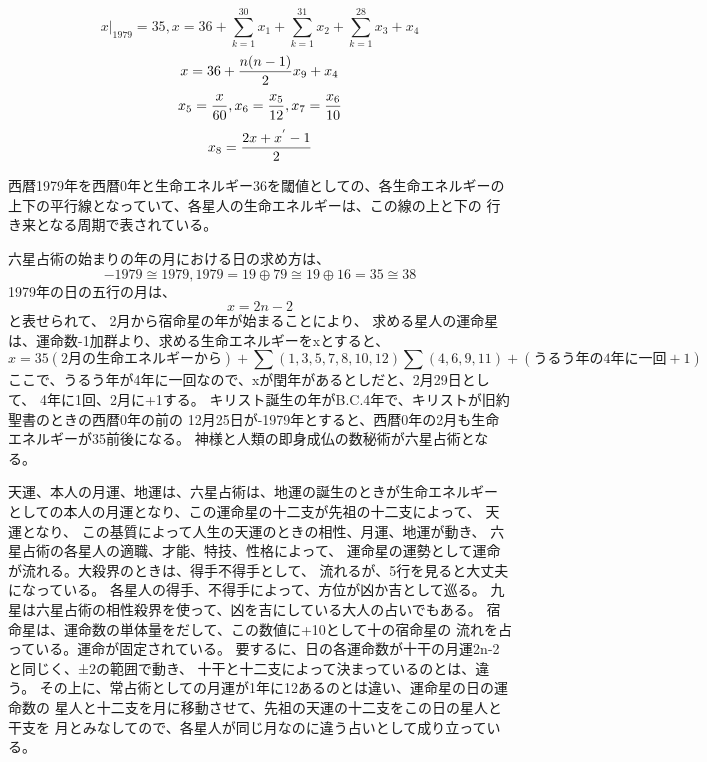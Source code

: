 ﻿\documentclass{jsarticle}
\begin{document}
  $$ x|_{1979} = 35, x = 36 + \sum_{k=1}^{30} x_1 + \sum_{k=1}^{31} x_2 + \sum_{k=1}^{28} x_3 + x_4 $$
  $$ x = 36 + {n (n - 1) \over 2} x_9 + x_4 $$
  $$ x_5 = {x \over 60}, x_6 = {x_5 \over 12}, x_7 = {x_6 \over 10} $$
  $$ x_8 = {2x + x^{'} -1 \over 2} $$

  西暦1979年を西暦0年と生命エネルギー36を閾値としての、各生命エネルギーの
  上下の平行線となっていて、各星人の生命エネルギーは、この線の上と下の
  行き来となる周期で表されている。
  
  六星占術の始まりの年の月における日の求め方は、　
  $$ -1979 \cong 1979, 1979 = 19 \oplus 79 \cong 19 \oplus 16 = 35 \cong 38 $$
  1979年の日の五行の月は、
  $$ x = 2n - 2 $$
  と表せられて、
  2月から宿命星の年が始まることにより、
  求める星人の運命星は、運命数-1加群より、求める生命エネルギーをxとすると、
  $$ x = 35(2月の生命エネルギーから) + \sum(1,3,5,7,8,10,12) \sum(4,6,9,11) 
  + (うるう年の4年に一回+1) $$
  ここで、うるう年が4年に一回なので、xが閏年があるとしだと、2月29日として、
  4年に1回、2月に+1する。
  キリスト誕生の年がB.C.4年で、キリストが旧約聖書のときの西暦0年の前の
  12月25日が-1979年とすると、西暦0年の2月も生命エネルギーが35前後になる。
  神様と人類の即身成仏の数秘術が六星占術となる。

  天運、本人の月運、地運は、六星占術は、地運の誕生のときが生命エネルギー
  としての本人の月運となり、この運命星の十二支が先祖の十二支によって、
  天運となり、
  この基質によって人生の天運のときの相性、月運、地運が動き、
  六星占術の各星人の適職、才能、特技、性格によって、
  運命星の運勢として運命が流れる。大殺界のときは、得手不得手として、
  流れるが、5行を見ると大丈夫になっている。
  各星人の得手、不得手によって、方位が凶か吉として巡る。
  九星は六星占術の相性殺界を使って、凶を吉にしている大人の占いでもある。
  宿命星は、運命数の単体量をだして、この数値に+10として十の宿命星の
  流れを占っている。運命が固定されている。
  要するに、日の各運命数が十干の月運2n-2と同じく、±2の範囲で動き、
  十干と十二支によって決まっているのとは、違う。
  その上に、常占術としての月運が1年に12あるのとは違い、運命星の日の運命数の
  星人と十二支を月に移動させて、先祖の天運の十二支をこの日の星人と干支を
  月とみなしてので、各星人が同じ月なのに違う占いとして成り立っている。
\end{document}

